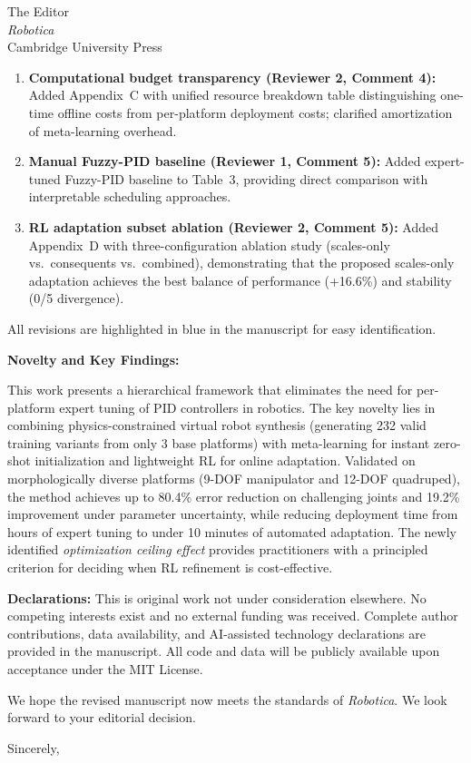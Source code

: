 \documentclass[11pt]{letter}
\begin{document}
\begin{letter}{%
The Editor\\
\textit{Robotica}\\
Cambridge University Press}
\begin{enumerate}
    \item \textbf{Computational budget transparency (Reviewer 2, Comment 4):} Added Appendix~C with unified resource breakdown table distinguishing one-time offline costs from per-platform deployment costs; clarified amortization of meta-learning overhead.

    \item \textbf{Manual Fuzzy-PID baseline (Reviewer 1, Comment 5):} Added expert-tuned Fuzzy-PID baseline to Table~3, providing direct comparison with interpretable scheduling approaches.

    \item \textbf{RL adaptation subset ablation (Reviewer 2, Comment 5):} Added Appendix~D with three-configuration ablation study (scales-only vs.\ consequents vs.\ combined), demonstrating that the proposed scales-only adaptation achieves the best balance of performance (+16.6\%) and stability (0/5 divergence).
\end{enumerate}

\noindent All revisions are highlighted in {\color{blue}blue} in the manuscript for easy identification.

\medskip
\noindent\textbf{Novelty and Key Findings:}

This work presents a hierarchical framework that eliminates the need for per-platform expert tuning of PID controllers in robotics. The key novelty lies in combining physics-constrained virtual robot synthesis (generating 232 valid training variants from only 3 base platforms) with meta-learning for instant zero-shot initialization and lightweight RL for online adaptation. Validated on morphologically diverse platforms (9-DOF manipulator and 12-DOF quadruped), the method achieves up to 80.4\% error reduction on challenging joints and 19.2\% improvement under parameter uncertainty, while reducing deployment time from hours of expert tuning to under 10 minutes of automated adaptation. The newly identified \textit{optimization ceiling effect} provides practitioners with a principled criterion for deciding when RL refinement is cost-effective.

\medskip
\noindent\textbf{Declarations:} This is original work not under consideration elsewhere. No competing interests exist and no external funding was received. Complete author contributions, data availability, and AI-assisted technology declarations are provided in the manuscript. All code and data will be publicly available upon acceptance under the MIT License.

\medskip
We hope the revised manuscript now meets the standards of \textit{Robotica}. We look forward to your editorial decision.

\closing{Sincerely,}

\end{letter}
\end{document}
